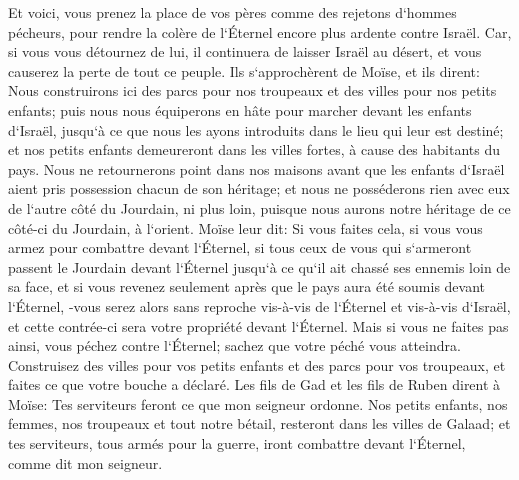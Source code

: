 \verse Et voici, vous prenez la place de vos pères comme des rejetons d`hommes pécheurs, pour rendre la colère de l`Éternel encore plus ardente contre Israël. 
\verse Car, si vous vous détournez de lui, il continuera de laisser Israël au désert, et vous causerez la perte de tout ce peuple. 
\verse Ils s`approchèrent de Moïse, et ils dirent: Nous construirons ici des parcs pour nos troupeaux et des villes pour nos petits enfants; 
\verse puis nous nous équiperons en hâte pour marcher devant les enfants d`Israël, jusqu`à ce que nous les ayons introduits dans le lieu qui leur est destiné; et nos petits enfants demeureront dans les villes fortes, à cause des habitants du pays. 
\verse Nous ne retournerons point dans nos maisons avant que les enfants d`Israël aient pris possession chacun de son héritage; 
\verse et nous ne posséderons rien avec eux de l`autre côté du Jourdain, ni plus loin, puisque nous aurons notre héritage de ce côté-ci du Jourdain, à l`orient. 
\verse Moïse leur dit: Si vous faites cela, si vous vous armez pour combattre devant l`Éternel, 
\verse si tous ceux de vous qui s`armeront passent le Jourdain devant l`Éternel jusqu`à ce qu`il ait chassé ses ennemis loin de sa face, 
\verse et si vous revenez seulement après que le pays aura été soumis devant l`Éternel, -vous serez alors sans reproche vis-à-vis de l`Éternel et vis-à-vis d`Israël, et cette contrée-ci sera votre propriété devant l`Éternel. 
\verse Mais si vous ne faites pas ainsi, vous péchez contre l`Éternel; sachez que votre péché vous atteindra. 
\verse Construisez des villes pour vos petits enfants et des parcs pour vos troupeaux, et faites ce que votre bouche a déclaré. 
\verse Les fils de Gad et les fils de Ruben dirent à Moïse: Tes serviteurs feront ce que mon seigneur ordonne. 
\verse Nos petits enfants, nos femmes, nos troupeaux et tout notre bétail, resteront dans les villes de Galaad; 
\verse et tes serviteurs, tous armés pour la guerre, iront combattre devant l`Éternel, comme dit mon seigneur. 
